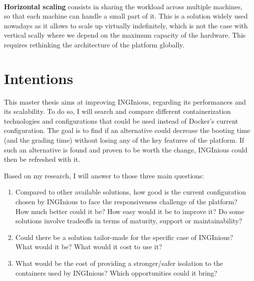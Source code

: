 \paragraph{} \textbf{Horizontal scaling} consists in sharing the workload across multiple machines, so that each machine can handle a small part of it.  This is a solution widely used nowadays as it allows to scale up virtually indefinitely, which is not the case with vertical scally where we depend on the maximum capacity of the hardware.  This requires rethinking the architecture of the platform globally.

\section{Intentions}
This master thesis aims at improving INGInious, regarding its performances and its scalability.  To do so, I will search and compare different containerization technologies and configurations that could be used instead of Docker's current configuration.  The goal is to find if an alternative could decrease the booting time (and the grading time) without losing any of the key features of the platform.  If such an alternative is found and proven to be worth the change, INGInious could then be refreshed with it.

Based on my research, I will answer to those three main questions:
\begin{enumerate}
  \item Compared to other available solutions, how good is the current configuration chosen by INGInious to face the responsiveness challenge of the platform?  How much better could it be?  How easy would it be to improve it?  Do some solutions involve tradeoffs in terms of maturity, support or maintainability?
  \item Could there be a solution tailor-made for the specific case of INGInious?  What would it be?  What would it cost to use it?
  \item What would be the cost of providing a stronger/safer isolation to the containers used by INGInious?  Which opportunities could it bring?
\end{enumerate}
